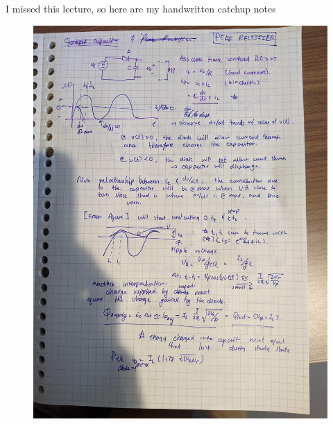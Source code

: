 \documentclass[../notes.tex]{subfiles}
\begin{document}
\begin{fullpage}
	I missed this lecture, so here are my handwritten catchup notes
	\begin{figure}[H]
		\centering
		\includegraphics[width=\linewidth]{img/image_2022-09-29-16-36-40.png}
	\end{figure}
\end{fullpage}
\end{document}
